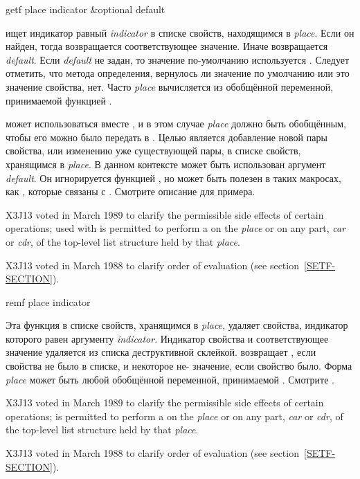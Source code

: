 \begin{defun}[Функция]
getf place indicator &optional default

 ищет индикатор равный  \emph{indicator} в списке свойств,
находящимся в \emph{place}. Если он найден, тогда возвращается соответствующее
значение. Иначе возвращается \emph{default}. Если \emph{default} не задан, то
значение по-умолчанию используется {\false}.
Следует отметить, что метода определения, вернулось ли значение по умолчанию или
это значение свойства, нет.
Часто \emph{place} вычисляется из обобщённой переменной, принимаемой функцией
.

 может использоваться вместе , и в этом случае \emph{place}
должно быть обобщённым, чтобы его можно было передать в . Целью
является добавление новой пары свойства, или изменению уже существующей пары, в
списке свойств, хранящимся в \emph{place}.
В данном контексте может быть использован аргумент \emph{default}. Он
игнорируется функцией , но может быть полезен в таких макросах, как
, которые связаны с .
Смотрите описание  для примера.
\begin{newer}
X3J13 voted in March 1989 
to clarify the permissible side effects of certain operations;
 used with  is permitted to perform a 
on the \emph{place} or on any part, \emph{car} or \emph{cdr}, of the
top-level list structure held by that \emph{place}.
\end{newer}

\begin{newer}
X3J13 voted in March 1988 
to clarify order of evaluation (see section~\ref{SETF-SECTION}).
\end{newer}
\end{defun}

\begin{defmac}
remf place indicator

Эта функция в списке свойств, хранящимся в \emph{place}, удаляет свойства,
индикатор которого равен  аргументу \emph{indicator}. Индикатор свойства
и соответствующее значение удаляется из списка деструктивной
склейкой.  возвращает {\false}, если свойства не было в списке, и
некоторое не-{\nil} значение, если свойство было.
Форма \emph{place} может быть любой обобщённой переменной, принимаемой
.
Смотрите .

\begin{newer}
X3J13 voted in March 1989 
to clarify the permissible side effects of certain operations;
 is permitted to perform a 
on the \emph{place} or on any part, \emph{car} or \emph{cdr}, of the
top-level list structure held by that \emph{place}.
\end{newer}

\begin{newer}
X3J13 voted in March 1988 
to clarify order of evaluation (see section~\ref{SETF-SECTION}).
\end{newer}
\end{defmac}

